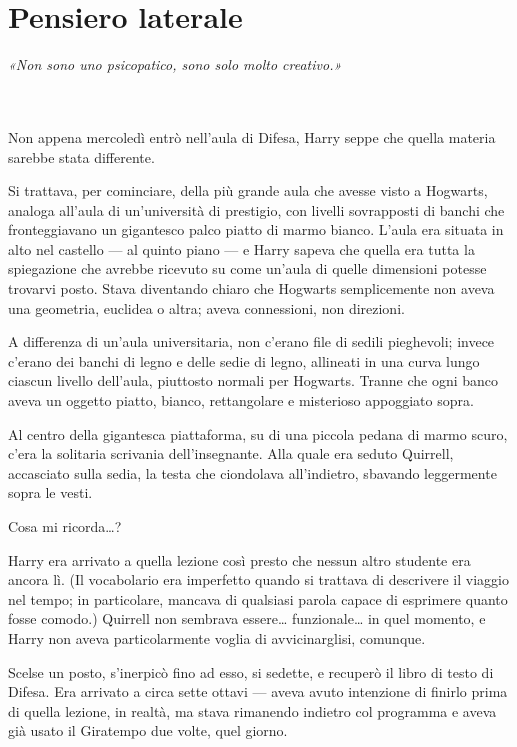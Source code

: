 
\chapter{Pensiero laterale}
\label{capitolo:16}

\emph{«Non sono uno psicopatico, sono solo molto creativo.»}

~\\
~\\

Non appena mercoledì entrò nell’aula di Difesa, Harry seppe che quella materia sarebbe stata differente.

Si trattava, per cominciare, della più grande aula che avesse visto a Hogwarts, analoga all’aula di un’università di prestigio, con livelli sovrapposti di banchi che fronteggiavano un gigantesco palco piatto di marmo bianco. L’aula era situata in alto nel castello — al quinto piano — e Harry sapeva che quella era tutta la spiegazione che avrebbe ricevuto su come un’aula di quelle dimensioni potesse trovarvi posto. Stava diventando chiaro che Hogwarts semplicemente non aveva una geometria, euclidea o altra; aveva connessioni, non direzioni.

A differenza di un’aula universitaria, non c’erano file di sedili pieghevoli; invece c’erano dei banchi di legno e delle sedie di legno, allineati in una curva lungo ciascun livello dell’aula, piuttosto normali per Hogwarts. Tranne che ogni banco aveva un oggetto piatto, bianco, rettangolare e misterioso appoggiato sopra.

Al centro della gigantesca piattaforma, su di una piccola pedana di marmo scuro, c’era la solitaria scrivania dell’insegnante. Alla quale era seduto Quirrell, accasciato sulla sedia, la testa che ciondolava all’indietro, sbavando leggermente sopra le vesti.

Cosa mi ricorda…?

Harry era arrivato a quella lezione così presto che nessun altro studente era ancora lì. (Il vocabolario era imperfetto quando si trattava di descrivere il viaggio nel tempo; in particolare, mancava di qualsiasi parola capace di esprimere quanto fosse comodo.) Quirrell non sembrava essere… funzionale… in quel momento, e Harry non aveva particolarmente voglia di avvicinarglisi, comunque.

Scelse un posto, s’inerpicò fino ad esso, si sedette, e recuperò il libro di testo di Difesa. Era arrivato a circa sette ottavi — aveva avuto intenzione di finirlo prima di quella lezione, in realtà, ma stava rimanendo indietro col programma e aveva già usato il Giratempo due volte, quel giorno.

